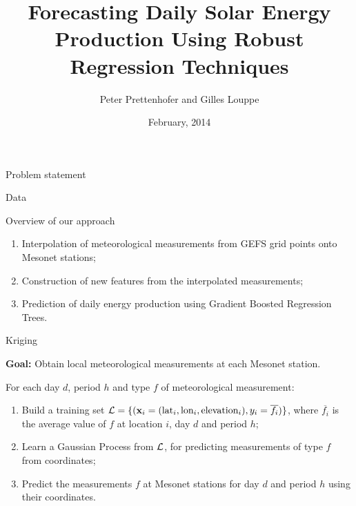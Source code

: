 \documentclass[handout]{beamer}
\title{Forecasting Daily Solar Energy Production Using Robust Regression Techniques}
\author{Peter Prettenhofer and Gilles Louppe}
\institute{Graz University of Technology, Austria\\
Université de Liège, Belgium}
\date{February, 2014}
\begin{document}

\begin{frame}
\titlepage
\end{frame}



\begin{frame}{Problem statement}

\end{frame}



\begin{frame}{Data}

\end{frame}



\begin{frame}{Overview of our approach}

\begin{enumerate}
\item Interpolation of meteorological measurements from GEFS grid points onto Mesonet stations;
\item Construction of new features from the interpolated measurements;
\item Prediction of daily energy production using Gradient Boosted Regression Trees.
\end{enumerate}

\end{frame}



\begin{frame}{Kriging}

\textbf{Goal:} Obtain local meteorological measurements at each Mesonet station.

\vskip0.5cm

For each day $d$, period $h$ and type $f$ of meteorological measurement:

\begin{enumerate}

\item Build a training set ${\cal L} = \{ (\mathbf{x}_i = (\text{lat}_i,
\text{lon}_i, \text{elevation}_i), y_i = \overline{f_i} ) \}$,  where
$\overline{f_i}$ is the average value of $f$ at location $i$, day $d$ and period $h$;

\item Learn a Gaussian Process from ${\cal L}$, for predicting measurements of type $f$ from coordinates;

\item Predict the measurements $f$ at Mesonet stations for day $d$ and period $h$ using their coordinates.

\end{enumerate}

\end{frame}
\end{document}

